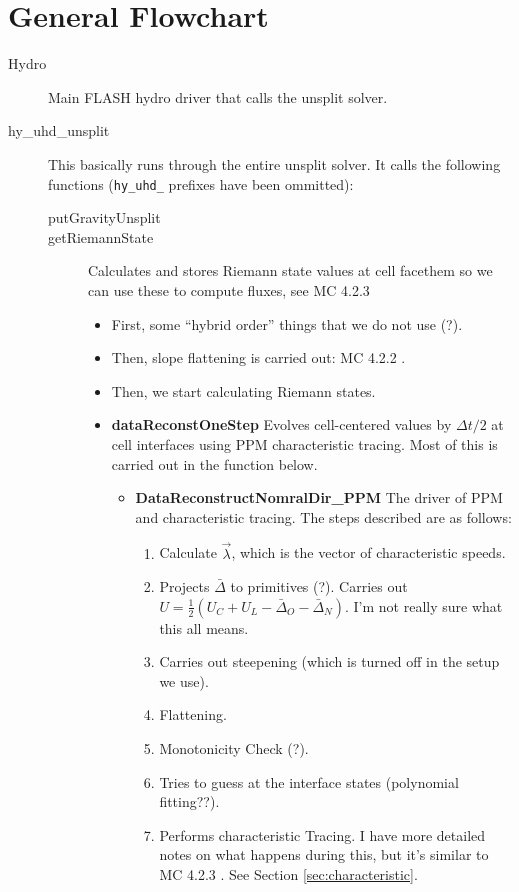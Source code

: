 \documentclass[preprint,11pt]{aastex}
\begin{document}
\section{General Flowchart}
\label{sec:flowchart}
\begin{description}
	\item[Hydro] Main FLASH hydro driver that calls the unsplit solver.
	\item[hy\_uhd\_unsplit] This basically runs through the entire unsplit solver.  It calls the following functions (\verb!hy_uhd_! prefixes have been ommitted):
	\begin{description}
		\item[putGravityUnsplit]
		\item[getRiemannState]  Calculates and stores Riemann state values at cell facethem so we can use these to compute fluxes, see MC 4.2.3
		\begin{itemize}
			\item First, some "`hybrid order"' things that we do not use (?).
			\item Then, slope flattening is carried out: MC 4.2.2 .
			\item Then, we start calculating Riemann states.
			\item \textbf{dataReconstOneStep} Evolves cell-centered values by $\Delta t / 2$ at cell interfaces using PPM characteristic tracing.  Most of this is carried out in the function below.
			\begin{itemize}
				\item \textbf{DataReconstructNomralDir\_PPM} The driver of PPM and characteristic tracing.  The steps described are as follows:
				\begin{enumerate}
					\item Calculate $\vec{\lambda}$, which is the vector of characteristic speeds.
					\item Projects $\bar{\Delta}$ to primitives (?).  Carries out $U = \frac{1}{2} \left( U_C + U_L -\bar{\Delta}_O  - \bar{\Delta}_N \right)$.  I'm not really sure what this all means.
					\item Carries out steepening (which is turned off in the setup we use).
					\item Flattening.
					\item Monotonicity Check (?).
					\item Tries to guess at the interface states (polynomial fitting??).
					\item Performs characteristic Tracing.  I have more detailed notes on what happens during this, but it's similar to MC 4.2.3 .  See Section \ref{sec:characteristic}.

\end{enumerate}
\end{itemize}
\end{itemize}
\end{description}
\end{description}
\end{document}
